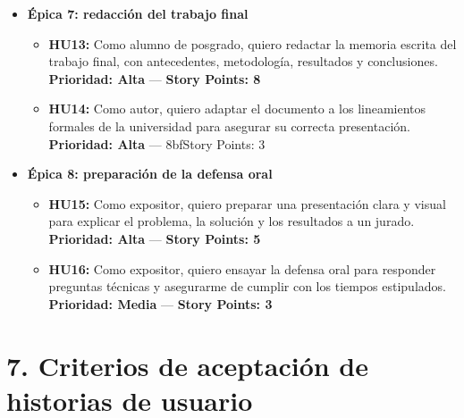 \documentclass[
11pt, %
]{charter}
\begin{document}
\begin{itemize}
  \item \textbf{Épica 7: redacción del trabajo final}
    \begin{itemize}
      \item \textbf{HU13:} Como alumno de posgrado, quiero redactar la memoria escrita del trabajo final, con antecedentes, metodología, resultados y conclusiones.  
      \newline \textbf{Prioridad: Alta} — \textbf{Story Points: 8}

      \item \textbf{HU14:} Como autor, quiero adaptar el documento a los lineamientos formales de la universidad para asegurar su correcta presentación.  
      \newline \textbf{Prioridad: Alta} — \text8bf{Story Points: 3}
    \end{itemize}

  \item \textbf{Épica 8: preparación de la defensa oral}
    \begin{itemize}
      \item \textbf{HU15:} Como expositor, quiero preparar una presentación clara y visual para explicar el problema, la solución y los resultados a un jurado.  
      \newline \textbf{Prioridad: Alta} — \textbf{Story Points: 5}

      \item \textbf{HU16:} Como expositor, quiero ensayar la defensa oral para responder preguntas técnicas y asegurarme de cumplir con los tiempos estipulados.  
      \newline \textbf{Prioridad: Media} — \textbf{Story Points: 3}
    \end{itemize}
\end{itemize}

\section{7. Criterios de aceptación de historias de usuario}
\label{sec:criteriosAceptacion}
\end{document}

